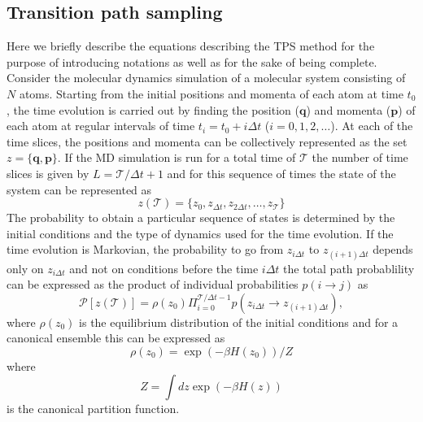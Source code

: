 \documentclass[journal=jpcbfk,manuscript=article,layout=traditional]{achemso}
\begin{document}
\subsection{Transition path sampling}
Here we briefly describe the equations describing the TPS method for the purpose of
introducing notations as well as for the sake of being complete. 
Consider the molecular dynamics simulation of a molecular system consisting 
of $N$ atoms. Starting from the initial positions and momenta of each atom at time $t_0$,
the time evolution is carried out by finding the position ($\textbf{q}$) and 
momenta ($\textbf{p}$) of each atom at regular intervals of time $t_i = t_0 + i\Delta t$  
($i = 0,1,2,\ldots$). At each of the time slices, the positions and 
momenta can be collectively represented as
the set $z = \{\textbf{q},\textbf{p}\}$. If the MD simulation is 
run for a total 
time of $\mathcal{T}$ the number of time slices is given by 
$L = \mathcal{T}/\Delta t +1$ and for this sequence of 
times the state of the system can be represented as 
\begin{equation}
z(\mathcal{T}) = \{z_0, z_{\Delta t}, z_{2\Delta t},\ldots,z_{\mathcal{T}}\}
\end{equation}
The probability to obtain a particular sequence of states is determined by the initial 
conditions and the type of dynamics used for the time evolution. If the time evolution is 
Markovian, the probability to go from $z_{i\Delta t}$ to $z_{(i+1)\Delta t}$ depends only 
on $z_{i\Delta t}$ and not on conditions before the time $i\Delta t$ the total path probablility can 
be expressed as the product of individual probabilities $p(i\rightarrow j)$ as 
\begin{equation}
\mathcal{P}[z(\mathcal{T})] = \rho(z_0)\Pi_{i=0}^{\mathcal{T}/\Delta t-1} p(z_{i\Delta t}\rightarrow z_{(i+1)\Delta t}),
\end{equation}
where $\rho(z_0)$ is the equilibrium distribution of the initial conditions and for a canonical ensemble this can be 
expressed as 
\begin{equation}
\rho(z_0) = \exp(-\beta H(z_0))/Z
\end{equation}
where 
\begin{equation}
Z = \int dz \exp(-\beta H(z)) 
\end{equation}
is the canonical partition function. 
\end{document}
